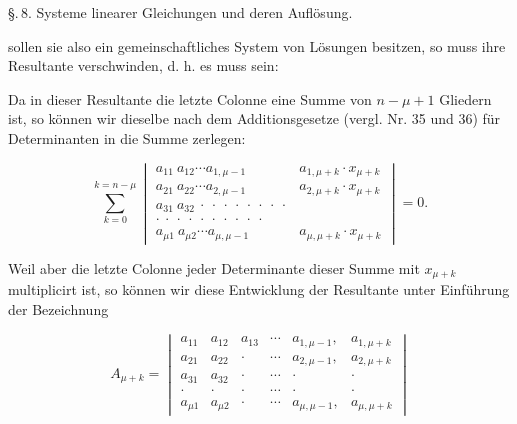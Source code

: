 \noindent \S.\,8. Systeme linearer Gleichungen und deren Aufl\"osung.

sollen sie also ein gemeinschaftliches System von L\"osungen besitzen, so muss ihre Resultante verschwinden, d. h. es muss sein:


Da in dieser Resultante die letzte Colonne eine Summe von $n-\mu+1$ Gliedern ist, so k\"onnen wir dieselbe nach dem Additionsgesetze (vergl. Nr. 35 und 36) f\"ur Determinanten in die Summe zerlegen:

\[
\sum_{k=0}^{k=n-\mu}
\begin{vmatrix}
a_{11}\ a_{12}\cdots a_{1,\mu-1} & a_{1,\mu+k}\cdot x_{\mu+k} \\
a_{21}\ a_{22}\cdots a_{2,\mu-1} & a_{2,\mu+k}\cdot x_{\mu+k} \\
a_{31}\ a_{32}\ \cdot\ \cdot\ \cdot\ \cdot\ \cdot\ \cdot\ \cdot\ \cdot & \\
\cdot\ \cdot\ \cdot\ \cdot\ \cdot\ \cdot\ \cdot\ \cdot\ \cdot\ \cdot & \\
a_{\mu 1}\ a_{\mu 2}\cdots a_{\mu,\mu-1} & a_{\mu,\mu+k}\cdot x_{\mu+k}
\end{vmatrix}=0.
\]

Weil aber die letzte Colonne jeder Determinante dieser Summe mit $x_{\mu+k}$ multiplicirt ist, so k\"onnen wir diese Entwicklung der Resultante unter Einf\"uhrung der Bezeichnung

\[
A_{\mu+k}=
\begin{vmatrix}
a_{11} & a_{12} & a_{13} & \cdots & a_{1,\mu-1}, & a_{1,\mu+k} \\
a_{21} & a_{22} & \cdot & \cdots & a_{2,\mu-1}, & a_{2,\mu+k} \\
a_{31} & a_{32} & \cdot & \cdots & \cdot & \cdot \\
\cdot & \cdot & \cdot & \cdots & \cdot & \cdot \\
a_{\mu 1} & a_{\mu 2} & \cdot & \cdots & a_{\mu,\mu-1}, & a_{\mu,\mu+k}
\end{vmatrix}
\]

